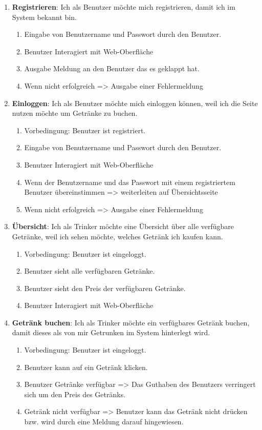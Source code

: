 \documentclass[conference,a4paper]{cs-techrep}
\begin{document}
\begin{enumerate}[{USM}1]
	
\item \textbf{Registrieren}: Ich als Benutzer möchte mich registrieren, damit ich im System bekannt bin.
	\begin{enumerate}
	\item Eingabe von Benutzername und Passwort durch den Benutzer.
	\item Benutzer Interagiert mit Web-Oberfläche
	\item Ausgabe Meldung an den Benutzer das es geklappt hat.
	\item Wenn nicht erfolgreich => Ausgabe einer Fehlermeldung
	\end{enumerate}

\item \textbf{Einloggen}: Ich als Benutzer möchte mich einloggen können, weil ich die Seite nutzen möchte um Getränke zu buchen.
\begin{enumerate}
	\item Vorbedingung: Benutzer ist registriert.
	\item Eingabe von Benutzername und Passwort durch den Benutzer.
	\item Benutzer Interagiert mit Web-Oberfläche
	\item Wenn der Benutzername und das Passwort mit einem registriertem Benutzer übereinstimmen => weiterleiten auf Übersichtsseite
	\item Wenn nicht erfolgreich => Ausgabe einer Fehlermeldung
\end{enumerate}

\item \textbf{Übersicht}: Ich als Trinker möchte eine Übersicht über alle verfügbare Getränke, weil ich sehen möchte, welches Getränk ich kaufen kann.
\begin{enumerate}
	\item Vorbedingung: Benutzer ist eingeloggt.
	\item Benutzer sieht alle verfügbaren Getränke.
	\item Benutzer sieht den Preis der verfügbaren Getränke.
	\item Benutzer Interagiert mit Web-Oberfläche
\end{enumerate}

\item \textbf{Getränk buchen}: Ich als Trinker möchte ein verfügbares Getränk buchen, damit dieses als von mir Getrunken im System hinterlegt wird.
\begin{enumerate}
	\item Vorbedingung: Benutzer ist eingeloggt.
	\item Benutzer kann auf ein Getränk klicken.
	\item Benutzer Getränke verfügbar => Das Guthaben des Benutzers verringert sich um den Preis des Getränks.
	\item Getränk nicht verfügbar => Benutzer kann das Getränk nicht drücken bzw. wird durch eine Meldung darauf hingewiesen.
\end{enumerate}


\end{enumerate}
\end{document}
